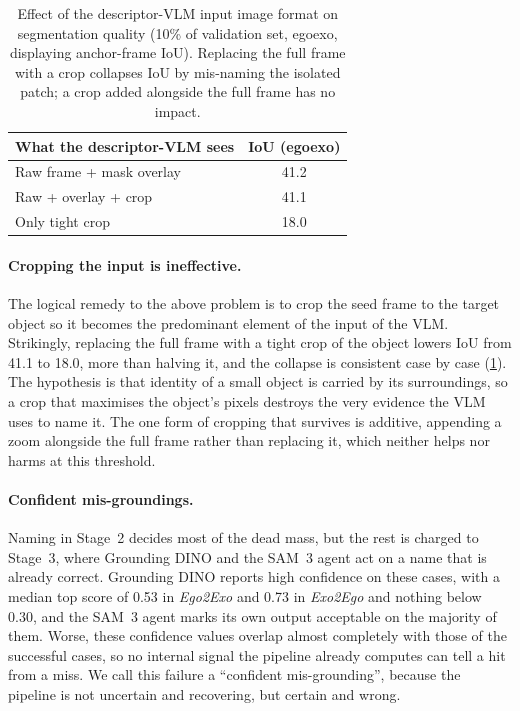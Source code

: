 \begin{table}[t]
\centering
\caption{Effect of the descriptor-VLM input image format on segmentation
  quality (10\% of validation set, egoexo, displaying anchor-frame IoU). Replacing the full frame with a crop collapses IoU by mis-naming the isolated patch; a crop added
  alongside the full frame has no impact.}
\label{tab:vlm-input-format}
\begin{tabular}{@{}lc@{}}
  \toprule
  What the descriptor-VLM sees & IoU (egoexo) \\
  \midrule
  Raw frame + mask overlay          & 41.2  \\
  Raw + overlay + crop                           & 41.1   \\
  Only tight crop                     & 18.0  \\
  \bottomrule
\end{tabular}
\end{table}

\paragraph{Cropping the input is ineffective.}
\label{subsec:crop}

The logical remedy to the above problem is to crop the seed frame to the target object so it becomes the predominant element of the input of the VLM. Strikingly, replacing the full frame with a tight crop of the object lowers IoU from 41.1 to 18.0, more than halving it, and the collapse is consistent case by case (\cref{tab:vlm-input-format}). The hypothesis is that identity of a small object is carried by its surroundings, so a crop that maximises the object's pixels destroys the very evidence the VLM uses to name it. The one form of cropping that survives is additive, appending a zoom alongside the full frame rather than replacing it, which neither helps nor harms at this threshold. 

\paragraph{Confident mis-groundings.}
\label{subsec:confident-wrong}

Naming in Stage~2 decides most of the dead mass, but the rest is charged to Stage~3, where Grounding DINO and the SAM~3 agent act on a name that is already correct. Grounding DINO reports high confidence on these cases, with a median top score of 0.53 in \textit{Ego2Exo} and 0.73 in \textit{Exo2Ego} and nothing below 0.30, and the SAM~3 agent marks its own output acceptable on the majority of them. Worse, these confidence values overlap almost completely with those of the successful cases, so no internal signal the pipeline already computes can tell a hit from a miss. We call this failure a ``confident mis-grounding'', because the pipeline is not uncertain and recovering, but certain and wrong.

